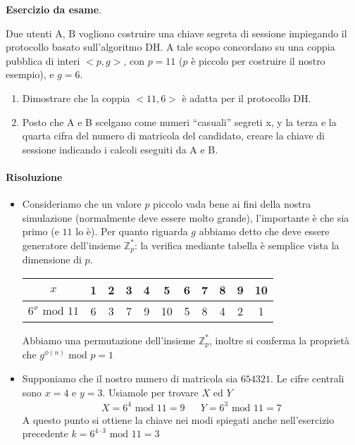 \begin{framed}
	\noindent \textbf{Esercizio da esame}.
	
	\noindent Due utenti A, B vogliono costruire una chiave segreta di sessione impiegando il protocollo basato
	sull’algoritmo DH. A tale scopo concordano su una coppia pubblica di interi $<p,g>$, con $p = 11$ ($p$ è
	piccolo per costruire il nostro esempio), e $g = 6$.
	\begin{enumerate}
		\item Dimostrare che la coppia $<11,6>$ è adatta per il protocollo DH. 
		\item Posto che A e B scelgano come numeri “casuali” segreti x, y la terza e la quarta cifra del
		numero di matricola del candidato, creare la chiave di sessione indicando i calcoli eseguiti da
		A e B. 
	\end{enumerate}
	\paragraph{Risoluzione} 
	\begin{itemize}
		\item Consideriamo che un valore $p$ piccolo vada bene ai fini della nostra simulazione (normalmente deve essere molto grande), l'importante è che sia primo (e $11$ lo è). Per quanto riguarda $g$ abbiamo detto che deve essere generatore dell'insieme $\mathbb{Z}_p^*$: la verifica mediante tabella è semplice vista la dimensione di $p$.
		\begin{center}
			\small
			\begin{tabular}{c|c c c c c c c c c c }
				$x$ & 1 & 2 & 3 & 4 & 5 & 6 & 7 & 8 & 9 & 10   \\
				\hline
				$6^{x} \text{ mod } 11$ & 6 & 3 & 7 & 9 & 10 & 5 & 8 & 4 & 2 & 1   \\
			\end{tabular}
		\end{center}
		Abbiamo una permutazione dell'insieme $\mathbb{Z}_p^*$, inoltre si conferma la proprietà che $g^{\phi(n)} \text{ mod } p=1$
		\item Supponiamo che il nostro numero di matricola sia $654321$. Le cifre centrali sono $x=4$ e $y=3$. Usiamole per trovare $X$ ed $Y$
		\begin{align*}
			X=6^4 \text{ mod }11=9&&Y=6^3 \text{ mod }11=7
		\end{align*}
		A questo punto si ottiene la chiave nei modi spiegati anche nell'esercizio precedente
		$k=6^{4\cdot 3} \text{ mod }11=3$
	\end{itemize}
\end{framed} 

